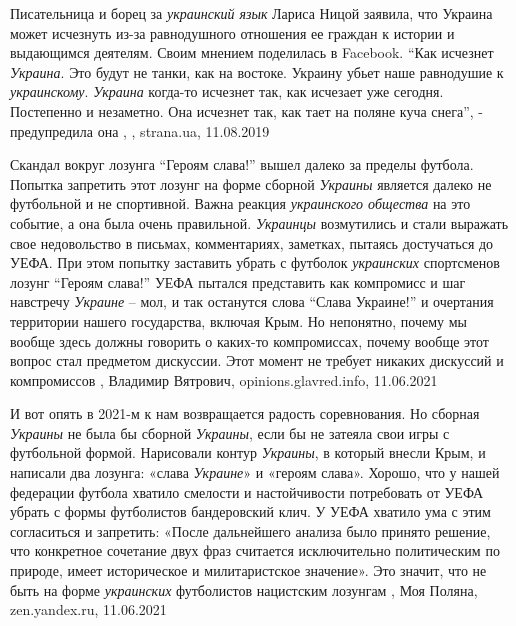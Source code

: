 Писательница и борец за \emph{украинский язык} Лариса Ницой заявила, что Украина может
исчезнуть из-за равнодушного отношения ее граждан к истории и выдающимся
деятелям. Своим мнением поделилась в Facebook.  \enquote{Как исчезнет \emph{Украина}. Это
будут не танки, как на востоке. Украину убьет наше равнодушие к \emph{украинскому}.
\emph{Украина} когда-то исчезнет так, как исчезает уже сегодня. Постепенно и
незаметно. Она исчезнет так, как тает на поляне куча снега}, - предупредила она
, , strana.ua, 11.08.2019


Скандал вокруг лозунга \enquote{Героям слава!} вышел далеко за пределы футбола.
Попытка запретить этот лозунг на форме сборной \emph{Украины} является далеко
не футбольной и не спортивной.  Важна реакция \emph{украинского общества} на
это событие, а она была очень правильной. \emph{Украинцы} возмутились и стали
выражать свое недовольство в письмах, комментариях, заметках, пытаясь
достучаться до УЕФА.  При этом попытку заставить убрать с футболок
\emph{украинских} спортсменов лозунг \enquote{Героям слава!} УЕФА пытался
представить как компромисс и шаг навстречу \emph{Украине} – мол, и так останутся слова
\enquote{Слава Украине!} и очертания территории нашего государства, включая
Крым. Но непонятно, почему мы вообще здесь должны говорить о каких-то
компромиссах, почему вообще этот вопрос стал предметом дискуссии. Этот момент
не требует никаких дискуссий и компромиссов
, 
Владимир Вятрович, opinions.glavred.info, 11.06.2021

И вот опять в 2021-м к нам возвращается радость соревнования. Но сборная
\emph{Украины} не была бы сборной \emph{Украины}, если бы не затеяла свои игры с футбольной
формой. Нарисовали контур \emph{Украины}, в который внесли Крым, и написали два
лозунга: «слава \emph{Украине}» и «героям слава». Хорошо, что у нашей федерации
футбола хватило смелости и настойчивости потребовать от УЕФА убрать с формы
футболистов бандеровский клич. У УЕФА хватило ума с этим согласиться и
запретить: «После дальнейшего анализа было принято решение, что конкретное
сочетание двух фраз считается исключительно политическим по природе, имеет
историческое и милитаристское значение». Это значит, что не быть на форме
\emph{украинских} футболистов нацистским лозунгам
, 
Моя Поляна, zen.yandex.ru, 11.06.2021

